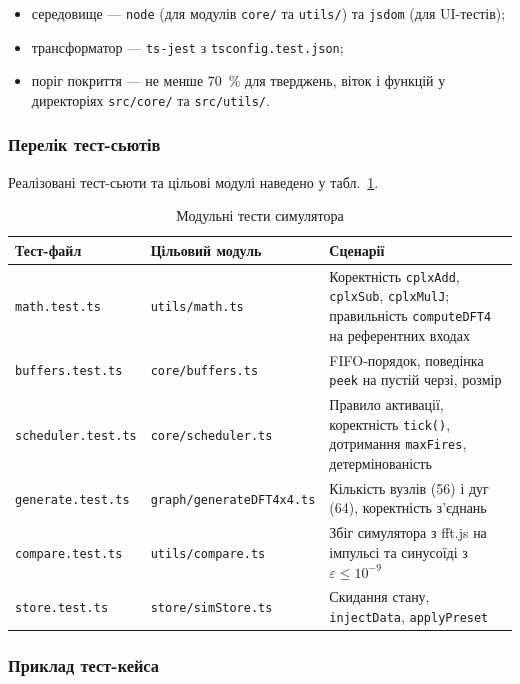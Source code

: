 \begin{itemize}
  \item середовище --- \texttt{node} (для модулів \texttt{core/} та
        \texttt{utils/}) та \texttt{jsdom} (для UI-тестів);
  \item трансформатор --- \texttt{ts-jest} з \texttt{tsconfig.test.json};
  \item поріг покриття --- не менше 70~\% для тверджень,
        віток і функцій у директоріях \texttt{src/core/} та
        \texttt{src/utils/}.
\end{itemize}

\subsubsection*{Перелік тест-сьютів}

Реалізовані тест-сьюти та цільові модулі наведено у
табл.~\ref{tab:tests}.

\begin{table}[H]
  \caption{Модульні тести симулятора}
  \label{tab:tests}
  \centering
  \small
  \begin{tabular}{p{3.2cm}p{4.0cm}p{5.8cm}}
    \toprule
    Тест-файл & Цільовий модуль & Сценарії \\
    \midrule
    \texttt{math.test.ts} & \texttt{utils/math.ts} & Коректність \texttt{cplxAdd}, \texttt{cplxSub}, \texttt{cplxMulJ}; правильність \texttt{computeDFT4} на референтних входах \\
    \texttt{buffers.test.ts} & \texttt{core/buffers.ts} & FIFO-порядок, поведінка \texttt{peek} на пустій черзі, розмір \\
    \texttt{scheduler.test.ts} & \texttt{core/scheduler.ts} & Правило активації, коректність \texttt{tick()}, дотримання \texttt{maxFires}, детермінованість \\
    \texttt{generate.test.ts} & \texttt{graph/generateDFT4x4.ts} & Кількість вузлів (56) і дуг (64), коректність з'єднань \\
    \texttt{compare.test.ts} & \texttt{utils/compare.ts} & Збіг симулятора з fft.js на імпульсі та синусоїді з $\varepsilon \le 10^{-9}$ \\
    \texttt{store.test.ts} & \texttt{store/simStore.ts} & Скидання стану, \texttt{injectData}, \texttt{applyPreset} \\
    \bottomrule
  \end{tabular}
\end{table}

\subsubsection*{Приклад тест-кейса}


